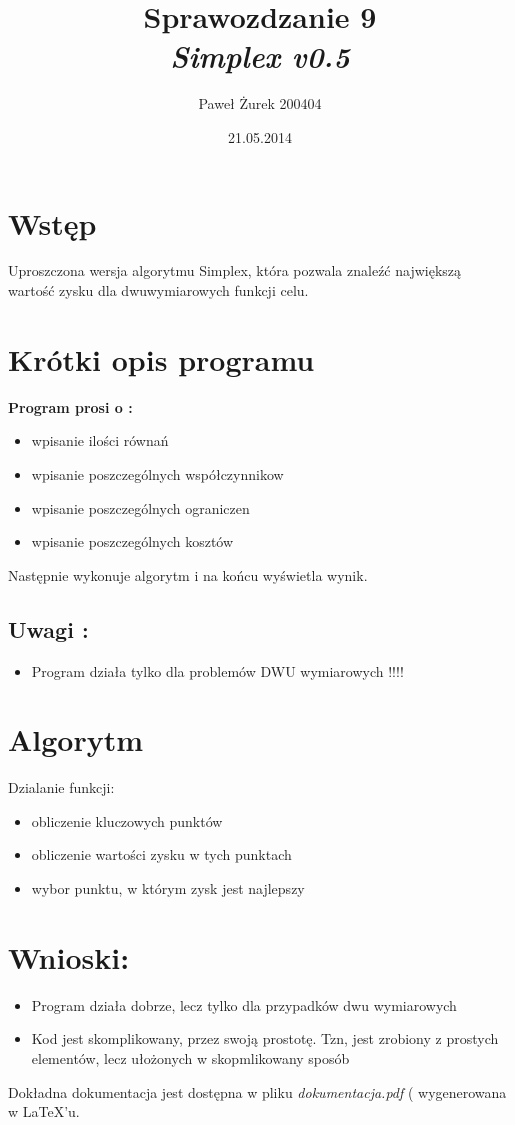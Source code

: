 \documentclass[10 pt]{article}
\title{Sprawozdzanie 9 \\ \emph{\textbf{Simplex v0.5}}}
\author{Paweł Żurek 200404}
\date{21.05.2014}
\begin{document}
\tableofcontents
\maketitle
\section{Wstęp}
Uproszczona wersja algorytmu Simplex, która pozwala znaleźć największą wartość zysku dla dwuwymiarowych funkcji celu.
\section{Krótki opis programu}
\textbf{Program prosi o : }
\begin{itemize}
\item wpisanie ilości równań
\item wpisanie poszczególnych współczynnikow
\item wpisanie poszczególnych ograniczen
\item wpisanie poszczególnych kosztów
\end{itemize}
Następnie wykonuje algorytm i na końcu wyświetla wynik.

\subsection{Uwagi :}
\begin{itemize}
\item Program działa tylko dla problemów DWU wymiarowych !!!!
\end{itemize}
\section{Algorytm }
Dzialanie funkcji:
\begin{itemize}
\item obliczenie kluczowych punktów
\item obliczenie wartości zysku w tych punktach
\item wybor punktu, w którym zysk jest najlepszy
\end{itemize}

\section{Wnioski:}
\begin{itemize}
\item Program działa dobrze, lecz tylko dla przypadków dwu wymiarowych
\item Kod jest skomplikowany, przez swoją prostotę. Tzn, jest zrobiony z prostych elementów, lecz ułożonych w skopmlikowany sposób
\end{itemize}

Dokładna dokumentacja jest dostępna w pliku \textit{dokumentacja.pdf} ( wygenerowana w \LaTeX 'u.
\end{document}
